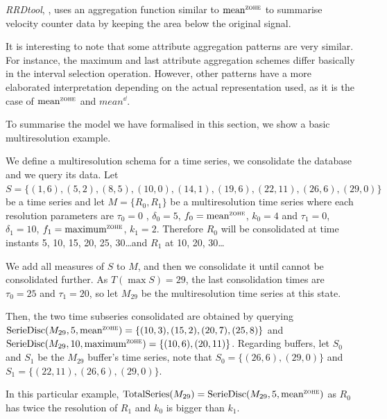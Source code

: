 \emph{RRDtool}, \cite{rrdtool}, uses an aggregation function similar
to $\meanz$ to summarise velocity counter data by keeping the area
below the original signal.

It is interesting to note that some attribute aggregation patterns are
very similar. For instance, the maximum and last attribute aggregation
schemes differ basically in the interval selection operation. However,
other patterns have a more elaborated interpretation depending on the
actual representation used, as it is the case of $\meanz$ and
$mean^\dd$.


To summarise the model we have formalised in this section, we show a
basic multiresolution example.
\begin{example}\label{ex:model:smultiresolution}
  We define a multiresolution schema for a time series, we consolidate
  the database and we query its data.  Let $S =
  \{(1,6),(5,2),\allowbreak (8,5),\allowbreak (10,0),\allowbreak
  (14,1),\allowbreak (19,6),\allowbreak (22,11),\allowbreak
  (26,6),(29,0) \}$ be a time series and let $M=\{R_0,R_1\}$ be a
  multiresolution time series where each resolution parameters are
  $\tau_0=0$ , $\delta_0=5$, $f_0 =\meanz$, $k_0=4$ and $\tau_1=0$,
  $\delta_1=10$, $f_1 =\maxz$, $k_1=2$. Therefore $R_0$ will be
  consolidated at time instants 5, 10, 15, 20, 25, 30\dots and $R_1$
  at 10, 20, 30\dots

  We add all measures of $S$ to $M$, and then we consolidate it until
  cannot be consolidated further. As $T(\max S)=29$, the last
  consolidation times are $\tau_0=25$ and $\tau_1=20$, so let $M_{29}$
  be the multiresolution time series at this state.

  Then, the two time subseries consolidated are obtained by querying
  $\seriedisc(M_{29},5,\meanz) = \{(10,3), (15,2), (20,7), (25,8)\}$
  and $\seriedisc(M_{29}, 10,\allowbreak \maxz) = \{(10,6),
  (20,11)\}$. Regarding buffers, let $S_0$ and $S_1$ be the $M_{29}$
  buffer's time series, note that $S_0= \{(26,6), (29,0)\}$ and
  $S_1=\{(22,11), (26,6), (29,0)\}$.

  In this particular example, $ \totalseries(M_{29}) =
  \seriedisc(M_{29}, 5, \meanz)$ as $R_0$ has twice the
  resolution of $R_1$ and $k_0$ is bigger than $k_1$.
\end{example}


